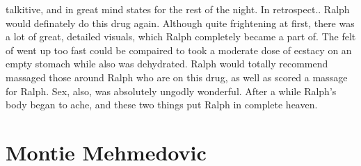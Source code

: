 \documentclass[12pt]{book}
\begin{document}
talkitive, and in great mind states for the rest of the night. In retrospect.. Ralph would definately do this drug again. Although quite frightening at first, there was a lot of great, detailed visuals, which Ralph completely became a part of. The felt of went up too fast could be compaired to took a moderate dose of ecstacy on an empty stomach while also was dehydrated. Ralph would totally recommend massaged those around Ralph who are on this drug, as well as scored a massage for Ralph. Sex, also, was absolutely ungodly wonderful. After a while Ralph's body began to ache, and these two things put Ralph in complete heaven.



\chapter{Montie Mehmedovic}
\end{document}
